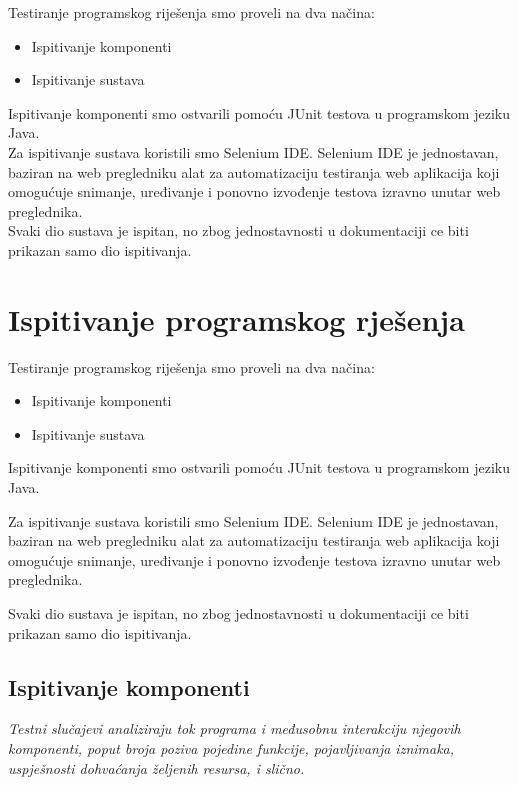 	Testiranje programskog riješenja smo proveli na dva        načina:
        \begin{itemize}
            \item Ispitivanje komponenti
            \item Ispitivanje sustava
        \end{itemize}
        Ispitivanje komponenti smo ostvarili pomoću JUnit testova u programskom jeziku Java.\\
        Za ispitivanje sustava koristili smo Selenium IDE. Selenium IDE je jednostavan, baziran na web pregledniku alat za automatizaciju testiranja web aplikacija koji omogućuje snimanje, uređivanje i ponovno izvođenje testova izravno unutar web preglednika.\\
        Svaki dio sustava je ispitan, no zbog jednostavnosti u dokumentaciji ce biti prikazan samo dio ispitivanja.

    

			
		
	
			
			\section{Ispitivanje programskog rješenja}
			
			Testiranje programskog riješenja smo proveli na dva načina:
			\begin{itemize}
				\item Ispitivanje komponenti
				\item Ispitivanje sustava
			\end{itemize}
			Ispitivanje komponenti smo ostvarili pomoću JUnit testova u programskom jeziku Java.
			
			Za ispitivanje sustava koristili smo Selenium IDE. Selenium IDE je jednostavan, baziran na web pregledniku alat za automatizaciju testiranja web aplikacija koji omogućuje snimanje, uređivanje i ponovno izvođenje testova izravno unutar web preglednika.
			
			Svaki dio sustava je ispitan, no zbog jednostavnosti u dokumentaciji ce biti prikazan samo dio ispitivanja.
			
			\subsection{Ispitivanje komponenti}
			\textit{Testni slučajevi analiziraju tok programa i međusobnu interakciju njegovih komponenti, poput broja poziva pojedine funkcije, pojavljivanja iznimaka, uspješnosti dohvaćanja željenih resursa, i slično.}
			
